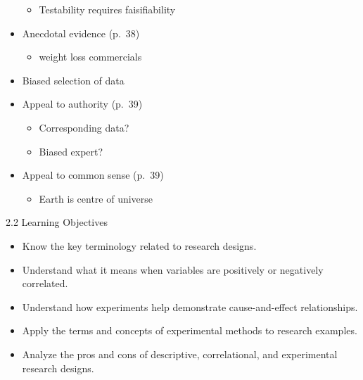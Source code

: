 \documentclass[
]{book}
\providecommand{\tightlist}{%
  \setlength{\itemsep}{0pt}\setlength{\parskip}{0pt}}
\begin{document}
\begin{reflect}
\begin{itemize}
  \begin{itemize}
  \tightlist
  \item
    Testability requires faisifiability\\
  \end{itemize}
\item
  Anecdotal evidence (p.~38)

  \begin{itemize}
  \tightlist
  \item
    weight loss commercials\\
  \end{itemize}
\item
  Biased selection of data\\
\item
  Appeal to authority (p.~39)

  \begin{itemize}
  \tightlist
  \item
    Corresponding data?\\
  \item
    Biased expert?\\
  \end{itemize}
\item
  Appeal to common sense (p.~39)

  \begin{itemize}
  \tightlist
  \item
    Earth is centre of universe
  \end{itemize}
\end{itemize}

2.2 Learning Objectives

\begin{itemize}
\tightlist
\item
  Know the key terminology related to research designs.\\
\item
  Understand what it means when variables are positively or negatively correlated.\\
\item
  Understand how experiments help demonstrate cause-and-effect relationships.\\
\item
  Apply the terms and concepts of experimental methods to research examples.\\
\item
  Analyze the pros and cons of descriptive, correlational, and experimental research designs.
\end{itemize}


\end{reflect}
\end{document}
